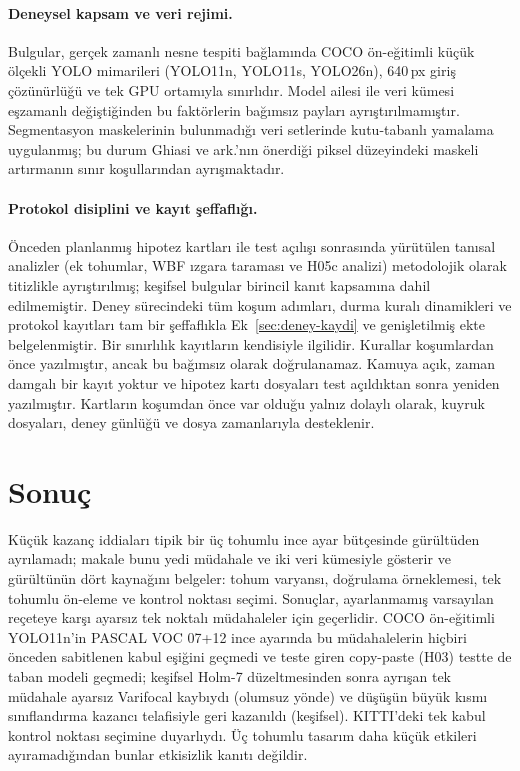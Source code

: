 \documentclass[pdflatex,iicol,sn-mathphys-num]{sn-jnl}
\begin{document}
\paragraph{Deneysel kapsam ve veri rejimi.}
Bulgular, gerçek zamanlı nesne tespiti bağlamında COCO ön-eğitimli küçük ölçekli YOLO mimarileri (YOLO11n, YOLO11s, YOLO26n), 640\,px giriş çözünürlüğü ve tek GPU ortamıyla sınırlıdır. Model ailesi ile veri kümesi eşzamanlı değiştiğinden bu faktörlerin bağımsız payları ayrıştırılmamıştır. Segmentasyon maskelerinin bulunmadığı veri setlerinde kutu-tabanlı yamalama uygulanmış; bu durum Ghiasi ve ark.'nın \cite{ghiasi_2021_copypaste} önerdiği piksel düzeyindeki maskeli artırmanın sınır koşullarından ayrışmaktadır.

\paragraph{Protokol disiplini ve kayıt şeffaflığı.}
Önceden planlanmış hipotez kartları ile test açılışı sonrasında yürütülen tanısal analizler (ek tohumlar, WBF ızgara taraması ve H05c analizi) metodolojik olarak titizlikle ayrıştırılmış; keşifsel bulgular birincil kanıt kapsamına dahil edilmemiştir. Deney sürecindeki tüm koşum adımları, durma kuralı dinamikleri ve protokol kayıtları tam bir şeffaflıkla Ek~\ref{sec:deney-kaydi} ve genişletilmiş ekte belgelenmiştir. Bir sınırlılık kayıtların kendisiyle ilgilidir. Kurallar koşumlardan önce yazılmıştır, ancak bu bağımsız olarak doğrulanamaz. Kamuya açık, zaman damgalı bir kayıt yoktur ve hipotez kartı dosyaları test açıldıktan sonra yeniden yazılmıştır. Kartların koşumdan önce var olduğu yalnız dolaylı olarak, kuyruk dosyaları, deney günlüğü ve dosya zamanlarıyla desteklenir.

\section{Sonuç}\label{sec:sonuc}

Küçük kazanç iddiaları tipik bir üç tohumlu ince ayar bütçesinde gürültüden ayrılamadı; makale bunu yedi müdahale ve iki veri kümesiyle gösterir ve gürültünün dört kaynağını belgeler: tohum varyansı, doğrulama örneklemesi, tek tohumlu ön-eleme ve kontrol noktası seçimi. Sonuçlar, ayarlanmamış varsayılan reçeteye karşı ayarsız tek noktalı müdahaleler için geçerlidir. COCO ön-eğitimli YOLO11n'in PASCAL VOC 07+12 ince ayarında bu müdahalelerin hiçbiri önceden sabitlenen kabul eşiğini geçmedi ve teste giren copy-paste (H03) testte de taban modeli geçmedi; keşifsel Holm-7 düzeltmesinden sonra ayrışan tek müdahale ayarsız Varifocal kaybıydı (olumsuz yönde) ve düşüşün büyük kısmı sınıflandırma kazancı telafisiyle geri kazanıldı (keşifsel). KITTI'deki tek kabul kontrol noktası seçimine duyarlıydı. Üç tohumlu tasarım daha küçük etkileri ayıramadığından bunlar etkisizlik kanıtı değildir.
\end{document}
